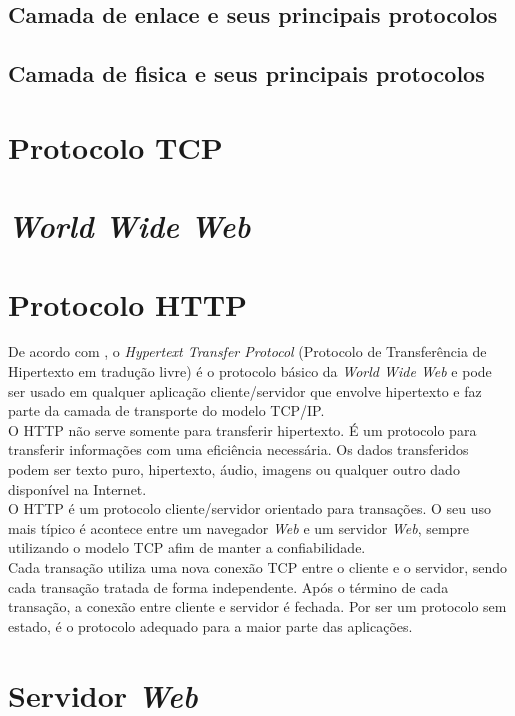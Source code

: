 \subsection{Camada de enlace e seus principais protocolos}
\subsection{Camada de fisica e seus principais protocolos}

\section{Protocolo TCP}

\section{\textit{World Wide Web}}

\section{Protocolo HTTP}
De acordo com , o \textit{Hypertext Transfer Protocol} (Protocolo de Transferência de Hipertexto em tradução livre) é o protocolo básico da \textit{World Wide Web} e pode ser usado em qualquer aplicação cliente/servidor que envolve hipertexto e faz parte da camada de transporte do modelo TCP/IP.\\
O HTTP não serve somente para transferir hipertexto. É um protocolo para transferir informações com uma eficiência necessária. Os dados transferidos podem ser texto puro, hipertexto, áudio, imagens ou qualquer outro dado disponível na Internet.\\
O HTTP é um protocolo cliente/servidor orientado para transações. O seu uso mais típico é acontece entre um navegador \textit{Web} e um servidor \textit{Web}, sempre utilizando o modelo TCP afim de manter a confiabilidade.\\
Cada transação utiliza uma nova conexão TCP entre o cliente e o servidor, sendo cada transação tratada de forma independente. Após o término de cada transação, a conexão entre cliente e servidor é fechada. Por ser um protocolo sem estado, é o protocolo adequado para a maior parte das aplicações.

\section{Servidor \textit{Web}}